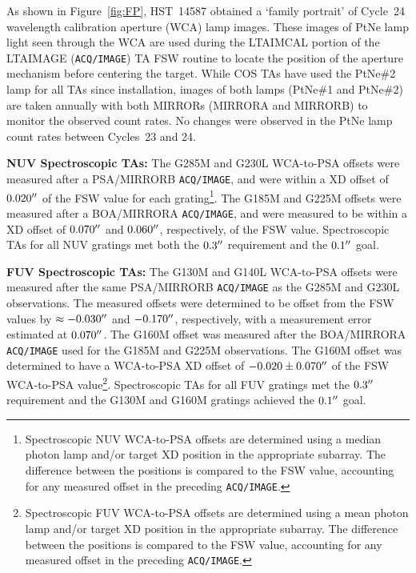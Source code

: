 \documentclass[12pt]{reportj}
\def\arcsec{\hbox{$^{\prime\prime}$}}
\newcommand{\tacq}[1]{\texttt{ACQ/#1}}
\begin{document}
\begin{description}
	As shown in Figure~\ref{fig:FP}, HST~14587 obtained a `family portrait' of Cycle~24 wavelength calibration aperture (WCA) lamp images. These images of PtNe lamp light seen through the WCA
	are used during the LTAIMCAL portion of the LTAIMAGE (\tacq{IMAGE}) TA FSW routine to locate the position of the aperture mechanism before centering the target.
	While COS TAs have used the PtNe\#2 lamp for all TAs since installation, images of both lamps (PtNe\#1 and  PtNe\#2) are taken annually with both MIRRORs
	(MIRRORA and  MIRRORB) to monitor the observed count rates. No changes were observed in the PtNe lamp count rates between Cycles~23 and 24.
	\clearpage
\item{\bf NUV Spectroscopic TAs:}
	The G285M and G230L WCA-to-PSA offsets were measured after a PSA/MIRRORB \tacq{IMAGE}, and were within a XD offset of $0.020\arcsec$ of the FSW value for each grating\footnote{Spectroscopic NUV WCA-to-PSA offsets are determined using a median photon lamp and/or target XD position in the appropriate subarray. The difference between the positions is compared to the FSW value, accounting for any measured offset in the preceding \tacq{IMAGE}.}.
	The G185M and G225M offsets were measured after a BOA/MIRRORA \tacq{IMAGE}, and were measured to be within a XD offset of $0.070\arcsec$ and $0.060\arcsec$, respectively, of the FSW value.
	Spectroscopic TAs for all NUV gratings met both the $0.3\arcsec$ requirement and the $0.1\arcsec$ goal.
\item{\bf FUV Spectroscopic TAs:}
	The G130M and G140L WCA-to-PSA offsets were measured after the same PSA/MIRRORB \tacq{IMAGE} as the G285M and G230L observations.
	The measured offsets were determined to be offset from the FSW values by $\approx -0.030\arcsec$ and $-0.170\arcsec$, respectively, with a measurement error estimated at $0.070\arcsec$.
	The G160M offset was measured after the BOA/MIRRORA \tacq{IMAGE} used for the G185M and G225M observations. The G160M offset was determined to have a WCA-to-PSA XD offset of $-0.020 \pm 0.070\arcsec$ of the FSW WCA-to-PSA value\footnote{Spectroscopic FUV WCA-to-PSA offsets are determined using a mean photon lamp and/or target XD position in the appropriate subarray. The difference between the positions is compared to the FSW value, accounting for any measured offset in the preceding \tacq{IMAGE}.}.
	Spectroscopic TAs for all FUV gratings met the $0.3\arcsec$ requirement and the G130M and G160M gratings achieved the $0.1\arcsec$ goal.
\end{description}
\end{document}
